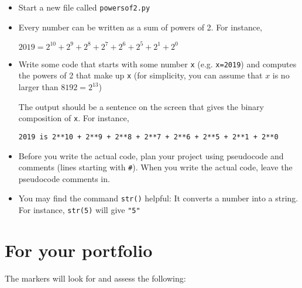 \documentclass[pdflatex,a4paper]{article}
\begin{document}
\begin{itemize}
\item
Start a new file called \verb=powersof2.py=
\item
Every number can be written as a sum of powers of 2. For instance,

\(
2019 = 2^{10} + 2^{9} + 2^{8} + 2^{7} + 2^{6} + 2^{5} + 2^{1} + 2^{0}
\)
\item
Write some code that starts with some number \verb=x= (e.g. \verb_x=2019_) and computes the powers of 2 that make up \verb=x= (for simplicity, you can assume that \(x\) is no larger than \(8192=2^{13}\))  

The output should be a sentence on the screen that gives the binary composition of \verb=x=. For instance,

\begin{verbatim}
2019 is 2**10 + 2**9 + 2**8 + 2**7 + 2**6 + 2**5 + 2**1 + 2**0
\end{verbatim}
\item
Before you write the actual code, plan your project using pseudocode and comments (lines starting with \verb=#=). When you write the actual code, leave the pseudocode comments in.
\item
You may find the command \verb=str()= helpful: It converts a number into a string. For instance, \verb=str(5)= will give \verb="5"=
\end{itemize}




\section{For your portfolio}

The markers will look for and assess the following:
\end{document}
